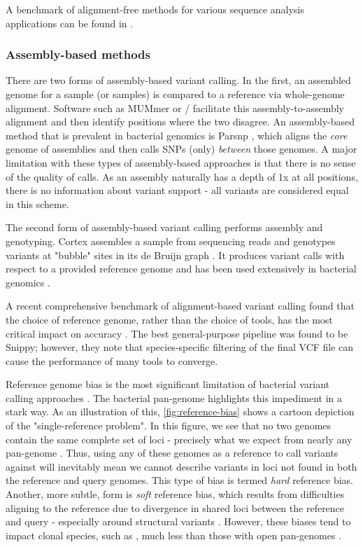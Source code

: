 A benchmark of alignment-free methods for various sequence analysis applications can be found in \cite{Zielezinski2019}. 

\subsubsection{Assembly-based methods}
\label{sec:asm-var-call}
There are two forms of assembly-based variant calling. In the first, an assembled genome for a sample (or samples) is compared to a reference via whole-genome alignment. Software such as MUMmer \cite{mummer2018} or / \cite{li2018} facilitate this assembly-to-assembly alignment and then identify positions where the two disagree. An assembly-based method that is prevalent in bacterial genomics is Parsnp \cite{Treangen2014}, which aligns the \emph{core} genome of assemblies and then calls SNPs (only) \emph{between} those genomes. A major limitation with these types of assembly-based approaches is that there is no sense of the quality of calls. As an assembly naturally has a depth of 1x at all positions, there is no information about variant support - all variants are considered equal in this scheme.

The second form of assembly-based variant calling performs assembly and genotyping. Cortex \denovo{} assembles a sample from sequencing reads and genotypes variants at "bubble" sites in its de Bruijn graph \cite{iqbal2012}. It produces variant calls with respect to a provided reference genome and has been used extensively in bacterial genomics \cite{bradley2015,hunt2019,Stasiewicz2015,Young2017,Lees2017}.

\hspace{0.75cm}

\noindent
A recent comprehensive benchmark of alignment-based variant calling found that the choice of reference genome, rather than the choice of tools, has the most critical impact on accuracy \cite{Bush2020}. The best general-purpose pipeline was found to be Snippy; however, they note that species-specific filtering of the final VCF file can cause the performance of many tools to converge.

Reference genome bias is the most significant limitation of bacterial variant calling approaches \cite{Bertels2014,Bush2020,Olson2015}. The bacterial pan-genome highlights this impediment in a stark way. As an illustration of this, \autoref{fig:reference-bias} shows a cartoon depiction of the "single-reference problem". In this figure, we see that no two genomes contain the same complete set of loci - precisely what we expect from nearly any pan-genome \cite{McInerney2017}. Thus, using any of these genomes as a reference to call variants against will inevitably mean we cannot describe variants in loci not found in both the reference and query genomes. This type of bias is termed \emph{hard} reference bias. Another, more subtle, form is \emph{soft} reference bias, which results from difficulties aligning to the reference due to divergence in shared loci between the reference and query - especially around structural variants \cite{Price2017,Olson2015,Pightling2014}. However, these biases tend to impact clonal species, such as \mtb{}, much less than those with open pan-genomes \cite{Bush2020}.

